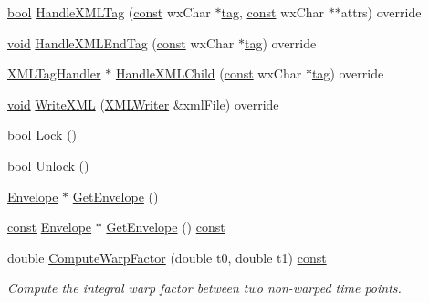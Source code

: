 \begin{DoxyCompactItemize}
\item 
\hyperlink{mac_2config_2i386_2lib-src_2libsoxr_2soxr-config_8h_abb452686968e48b67397da5f97445f5b}{bool} \hyperlink{class_time_track_a3005f2118dbd1f70b15955d21a814ed0}{Handle\+X\+M\+L\+Tag} (\hyperlink{getopt1_8c_a2c212835823e3c54a8ab6d95c652660e}{const} wx\+Char $\ast$\hyperlink{structtag}{tag}, \hyperlink{getopt1_8c_a2c212835823e3c54a8ab6d95c652660e}{const} wx\+Char $\ast$$\ast$attrs) override
\item 
\hyperlink{sound_8c_ae35f5844602719cf66324f4de2a658b3}{void} \hyperlink{class_time_track_a23b7aa1376fc8f939e317fdf47684689}{Handle\+X\+M\+L\+End\+Tag} (\hyperlink{getopt1_8c_a2c212835823e3c54a8ab6d95c652660e}{const} wx\+Char $\ast$\hyperlink{structtag}{tag}) override
\item 
\hyperlink{class_x_m_l_tag_handler}{X\+M\+L\+Tag\+Handler} $\ast$ \hyperlink{class_time_track_a3f653989dbb1bfc995963a1a1948bfb1}{Handle\+X\+M\+L\+Child} (\hyperlink{getopt1_8c_a2c212835823e3c54a8ab6d95c652660e}{const} wx\+Char $\ast$\hyperlink{structtag}{tag}) override
\item 
\hyperlink{sound_8c_ae35f5844602719cf66324f4de2a658b3}{void} \hyperlink{class_time_track_a82152e8a960bf5d375f0c590d815bac0}{Write\+X\+ML} (\hyperlink{class_x_m_l_writer}{X\+M\+L\+Writer} \&xml\+File) override
\item 
\hyperlink{mac_2config_2i386_2lib-src_2libsoxr_2soxr-config_8h_abb452686968e48b67397da5f97445f5b}{bool} \hyperlink{class_time_track_a69192ddc457506e93694b8096d633512}{Lock} ()
\item 
\hyperlink{mac_2config_2i386_2lib-src_2libsoxr_2soxr-config_8h_abb452686968e48b67397da5f97445f5b}{bool} \hyperlink{class_time_track_a86b4bcab43ff4809b3835a4b7b32f6cb}{Unlock} ()
\item 
\hyperlink{class_envelope}{Envelope} $\ast$ \hyperlink{class_time_track_abacec6fca980b03f0bf7a4f96310704a}{Get\+Envelope} ()
\item 
\hyperlink{getopt1_8c_a2c212835823e3c54a8ab6d95c652660e}{const} \hyperlink{class_envelope}{Envelope} $\ast$ \hyperlink{class_time_track_a988ecacb9626b4b1147f9ceadd9255f9}{Get\+Envelope} () \hyperlink{getopt1_8c_a2c212835823e3c54a8ab6d95c652660e}{const} 
\item 
double \hyperlink{class_time_track_ad2c56595b36654d037a8ef122ce3bca7}{Compute\+Warp\+Factor} (double t0, double t1) \hyperlink{getopt1_8c_a2c212835823e3c54a8ab6d95c652660e}{const} 
\begin{DoxyCompactList}\small\item\em Compute the integral warp factor between two non-\/warped time points. \end{DoxyCompactList}\item 
$$
\end{DoxyCompactItemize}
